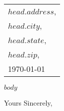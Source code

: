 \documentclass[12pt]{letter} %
\begin{document}


\begin{letter}

\vspace{3\baselineskip}%
{\raggedleft
\begin{tabular}{l@{}}
{$head.address$},\\
{$head.city$}, \\
{$head.state$}, \\
{$head.zip$}, \\
\today
\end{tabular}\par}




{$body$}

\vspace{2\parskip} %
\closing{Yours Sincerely,}
\vspace{2\parskip} %



\end{letter}
\end{document}
